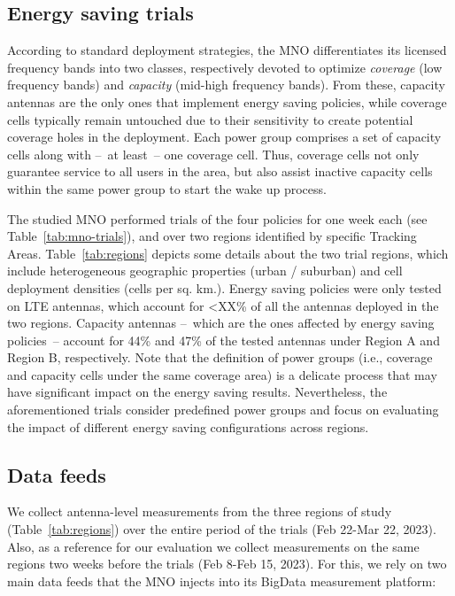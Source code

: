 \subsection{Energy saving trials}\label{subsec:energy-saving-trials}

According to standard deployment strategies, the MNO differentiates its licensed frequency bands into two classes, respectively devoted to optimize \textit{coverage} (low frequency bands) and \textit{capacity} (mid-high frequency bands). From these, capacity antennas are the only ones that implement energy saving policies, while coverage cells typically remain untouched due to their sensitivity to create potential coverage holes in the deployment. Each power group comprises a set of capacity cells along with --~at least~-- one coverage cell. %
Thus, coverage cells not only guarantee service to all users in the area, but also assist inactive capacity cells within the same power group to start the wake up process.  


The studied MNO performed trials of the four policies for one week each (see Table~\ref{tab:mno-trials}), and over two regions identified by specific Tracking Areas. Table~\ref{tab:regions} depicts some details about the two trial regions, which include heterogeneous geographic properties (urban / suburban) and cell deployment densities (cells per sq. km.). Energy saving policies were only tested on LTE antennas, which account for <XX\%  of all the antennas deployed in the two regions. Capacity antennas --~which are the ones affected by energy saving policies~-- account for 44\% and 47\% of the tested antennas under Region A and Region B, respectively. Note that the definition of power groups (i.e., coverage and capacity cells under the same coverage area) is a delicate process that may have significant impact on the energy saving results. Nevertheless, the aforementioned trials consider predefined power groups and focus on evaluating the impact of different energy saving configurations across regions.


\subsection{Data feeds}
We collect antenna-level measurements from the three regions of study (Table~\ref{tab:regions}) over the entire period of the trials (Feb 22-Mar 22, 2023). Also, as a reference for our evaluation we collect measurements on the same regions two weeks before the trials (Feb 8-Feb 15, 2023). For this, we rely on two main data feeds that the MNO injects into its BigData measurement platform: 

